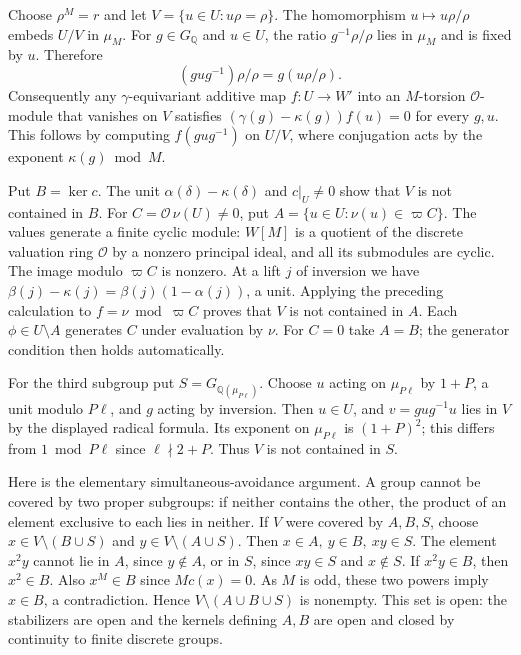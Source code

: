Choose \(\rho^M=r\) and let \(V=\{u\in U:u\rho=\rho\}\).
The homomorphism \(u\mapsto u\rho/\rho\) embeds
\(U/V\) in \(\mu_M\). For \(g\in G_{\mathbb Q}\) and \(u\in U\),
the ratio \(g^{-1}\rho/\rho\) lies in \(\mu_M\) and is fixed by
\(u\). Therefore
\[
       (gug^{-1})\rho/\rho=g(u\rho/\rho).
\]
Consequently any \(\gamma\)-equivariant additive map
\(f:U\to W'\) into an \(M\)-torsion \(\mathcal O\)-module that
vanishes on \(V\) satisfies
\((\gamma(g)-\kappa(g))f(u)=0\) for every \(g,u\). This follows
by computing \(f(gug^{-1})\) on \(U/V\), where conjugation acts
by the exponent \(\kappa(g)\bmod M\).

Put \(B=\ker c\). The unit \(\alpha(\delta)-\kappa(\delta)\) and
\(c|_U\ne0\) show that \(V\) is not contained in \(B\).
For \(C=\mathcal O\,\nu(U)\ne0\), put
\(A=\{u\in U:\nu(u)\in\varpi C\}\). The values generate a finite
cyclic module: \(W[M]\) is a quotient of the discrete valuation
ring \(\mathcal O\) by a nonzero principal ideal, and all its
submodules are cyclic. The image modulo \(\varpi C\) is nonzero.
At a lift \(j\) of inversion we have
\(\beta(j)-\kappa(j)=\beta(j)(1-\alpha(j))\), a unit. Applying
the preceding calculation to \(f=\nu\bmod\varpi C\) proves that
\(V\) is not contained in \(A\). Each \(\phi\in U\setminus A\)
generates \(C\) under evaluation by \(\nu\). For \(C=0\) take
\(A=B\); the generator condition then holds automatically.

For the third subgroup put \(S=G_{\mathbb Q(\mu_{P\ell})}\).
Choose \(u\) acting on \(\mu_{P\ell}\) by \(1+P\), a unit
modulo \(P\ell\), and \(g\) acting by inversion. Then \(u\in U\),
and \(v=gug^{-1}u\) lies in \(V\) by the displayed radical formula.
Its exponent on \(\mu_{P\ell}\) is \((1+P)^2\); this differs
from \(1\bmod P\ell\) since \(\ell\nmid 2+P\).
Thus \(V\) is not contained in \(S\).

Here is the elementary simultaneous-avoidance argument.
A group cannot be covered by two proper subgroups: if neither
contains the other, the product of an element exclusive to each lies
in neither. If \(V\) were covered by \(A,B,S\), choose
\(x\in V\setminus(B\cup S)\) and \(y\in V\setminus(A\cup S)\).
Then \(x\in A,\ y\in B,\ xy\in S\). The element \(x^2y\) cannot
lie in \(A\), since \(y\notin A\), or in \(S\), since \(xy\in S\)
and \(x\notin S\). If \(x^2y\in B\), then \(x^2\in B\).
Also \(x^M\in B\) since \(M c(x)=0\). As \(M\) is odd, these
two powers imply \(x\in B\), a contradiction. Hence
\(V\setminus(A\cup B\cup S)\) is nonempty. This set is open:
the stabilizers are open and the kernels defining \(A,B\) are
open and closed by continuity to finite discrete groups.

